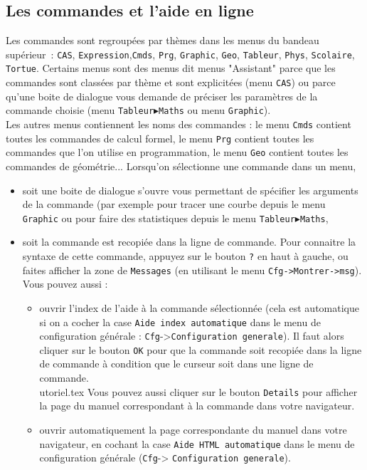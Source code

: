 \documentclass{article}
\begin{document}
\subsection{Les commandes et l'aide en ligne}
%
Les commandes sont regroup\'ees par th\`emes dans les
menus du bandeau sup\'erieur~: \verb|CAS|, \verb|Expression|,\verb|Cmds|,
\verb|Prg|, \verb|Graphic|,
\verb|Geo|, \verb|Tableur|,  \verb|Phys|, \verb|Scolaire|, \verb|Tortue|. 
Certains menus sont des menus dit menus "Assistant" parce que les commandes 
sont class\'ees par th\`eme et sont explicit\'ees (menu {\tt CAS}) ou parce 
qu'une boite de dialogue vous demande de 
pr\'eciser les param\`etres de la commande choisie (menu 
{\tt Tableur$\blacktriangleright$Maths} ou menu {\tt Graphic}).\\
Les autres menus contiennent les noms des commandes : 
le menu {\tt Cmds} contient toutes les commandes de calcul formel, 
le menu {\tt Prg} contient toutes les commandes que l'on utilise en  
programmation,
le menu {\tt Geo} contient toutes les commandes de g\'eom\'etrie...
Lorsqu'on s\'electionne une commande dans un menu, 
\begin{itemize}
\item soit une boite de dialogue s'ouvre vous permettant de sp\'ecifier
les arguments de la commande (par exemple pour tracer une courbe
depuis le menu \verb|Graphic| ou pour faire des statistiques depuis le menu 
{\tt Tableur$\blacktriangleright$Maths},
\item soit la commande est recopi\'ee dans la ligne de commande. Pour connaitre
la syntaxe de cette commande, appuyez sur le bouton \verb|?| en haut \`a 
gauche, ou faites afficher la zone de \verb|Messages| (en utilisant le menu 
\verb|Cfg->Montrer->msg|). \\
Vous pouvez aussi :
\begin{itemize}
\item ouvrir l'index de l'aide \`a la commande s\'electionn\'ee
(cela est  automatique si on  a cocher la case 
\verb|Aide index automatique| dans le menu de configuration 
g\'en\'erale : \verb|Cfg|->\verb|Configuration generale|). Il faut alors 
cliquer sur le bouton {\tt OK} pour que la commande soit recopi\'ee dans la 
ligne de commande \`a condition que le curseur soit dans une ligne de 
commande.\\utoriel.tex
Vous pouvez aussi cliquer sur le bouton
\verb|Details| pour afficher la page du manuel correspondant \`a la commande
dans votre navigateur. 

\item  ouvrir automatiquement la page correspondante du manuel dans votre 
navigateur, en cochant la case \verb|Aide HTML automatique| dans le menu de 
configuration  g\'en\'erale (\verb|Cfg|-> \verb|Configuration generale|).
\end{itemize}
\end{itemize}
\end{document}
